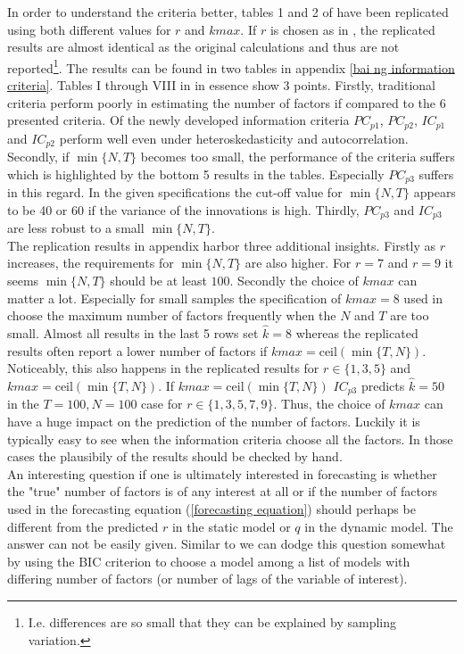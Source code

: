 \documentclass[11pt]{article}
\begin{document}
In order to understand the criteria better, tables 1 and 2 of \citet{bai2002determining} have been replicated using both different values for $r$ and $kmax$. If $r$ is chosen as in \citet{bai2002determining}, the replicated results are almost identical as the original calculations and thus are not reported\footnote{I.e. differences are so small that they can be explained by sampling variation.}. The results can be found in two tables in appendix \ref{bai ng information criteria}. Tables I through VIII in \citet{bai2002determining} in essence show $3$ points. Firstly, traditional criteria perform poorly in estimating the number of factors if compared to the $6$ presented criteria. Of the newly developed information criteria $PC_{p1}$, $PC_{p2}$, $IC_{p1}$ and $IC_{p2}$ perform well even under heteroskedasticity and autocorrelation. Secondly, if $\min\{N, T\}$ becomes too small, the performance of the criteria suffers which is highlighted by the bottom 5 results in the tables. Especially $PC_{p3}$ suffers in this regard. In the given specifications the cut-off value for $\min\{N, T\}$ appears to be 40 or 60 if the variance of the innovations is high. Thirdly, $PC_{p3}$ and $IC_{p3}$ are less robust to a small $\min\{N, T\}$. \\
The replication results in appendix \citet{bai2002determining} harbor three additional insights. Firstly as $r$ increases, the requirements for $\min\{N, T\}$ are also higher. For $r=7$ and $r=9$ it seems $\min\{N, T\}$ should be at least $100$. Secondly the choice of $kmax$ can matter a lot. Especially for small samples the specification of $kmax=8$ used in \citet{bai2002determining} choose the maximum number of factors frequently when the $N$ and $T$ are too small. Almost all results in the last 5 rows set $\hat k=8$ whereas the replicated results often report a lower number of factors if $kmax=\text{ceil}(\min\{T, N\})$. Noticeably, this also happens in the replicated results for $r \in \{1, 3, 5\}$ and $kmax=\text{ceil}(\min\{T, N\})$. If $kmax=\text{ceil}(\min\{T, N\})$ $IC_{p3}$ predicts $\hat k=50$ in the $T=100, N=100$ case for $r \in \{1, 3, 5, 7, 9\}$. Thus, the choice of $kmax$ can have a huge impact on the prediction of the number of factors. Luckily it is typically easy to see when the information criteria choose all the factors. In those cases the plausibily of the results should be checked by hand. \\

An interesting question if one is ultimately interested in forecasting is whether the "true" number of factors is of any interest at all or if the number of factors used in the forecasting equation (\ref{forecasting equation}) should perhaps be different from the predicted $r$ in the static model or $q$ in the dynamic model. The answer can not be easily given. Similar to \citet{bai2008forecasting} we can dodge this question somewhat by using the BIC criterion to choose a model among a list of models with differing number of factors (or number of lags of the variable of interest).
\end{document}
